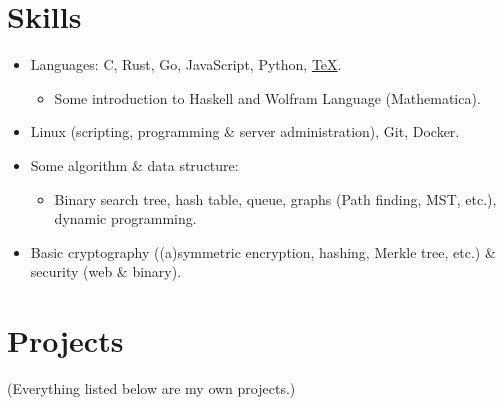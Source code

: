 \documentclass[a4paper]{article}
\begin{document}
  \section{Skills}

  \begin{itemize}[itemsep=0.1\parskip]
    \item Languages: C, Rust, Go, JavaScript, Python, \href{https://github.com/micromaomao/cv/blob/master/cv.tex}{\color{link}\TeX}.

    \begin{itemize}
      \item Some introduction to Haskell and Wolfram Language (Mathematica).
    \end{itemize}

    \item Linux (scripting, programming \& server administration), Git, Docker.

    \item Some algorithm \& data structure:

    \begin{itemize}
      \item Binary search tree, hash table, queue, graphs (Path finding, MST, etc.), dynamic programming.
    \end{itemize}

    \item Basic cryptography ((a)symmetric encryption, hashing, Merkle tree, etc.) \& security (web \& binary).

  \end{itemize}

  \section{Projects}

  \def\ghurl#1{%
    \href{#1}{({\blueghicon{}})}%
  }

  {\color{black!70!white}(Everything listed below are my own projects.)}
\end{document}
